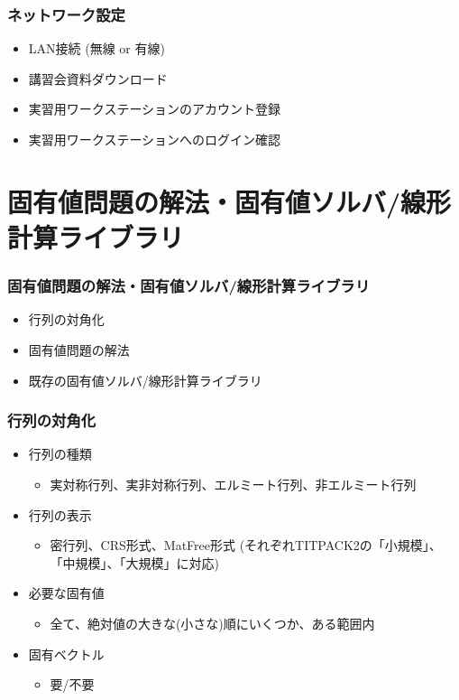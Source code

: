 \begin{frame}
  \frametitle{ネットワーク設定}
  \begin{itemize}
    \setlength{\itemsep}{1em}
  \item LAN接続 (無線 or 有線)
  \item 講習会資料ダウンロード
  \item 実習用ワークステーションのアカウント登録
  \item 実習用ワークステーションへのログイン確認
  \end{itemize}
\end{frame}

\section{固有値問題の解法・固有値ソルバ/線形計算ライブラリ}

\begin{frame}
  \frametitle{固有値問題の解法・固有値ソルバ/線形計算ライブラリ}
  \begin{itemize}
    \setlength{\itemsep}{1em}
  \item 行列の対角化
  \item 固有値問題の解法
  \item 既存の固有値ソルバ/線形計算ライブラリ
  \end{itemize}
\end{frame}

\begin{frame}
  \frametitle{行列の対角化}
  \begin{itemize}
  \item 行列の種類
    \begin{itemize}
    \item 実対称行列、実非対称行列、エルミート行列、非エルミート行列
    \end{itemize}
  \item 行列の表示
    \begin{itemize}
      \item 密行列、CRS形式、MatFree形式 (それぞれTITPACK2の「小規模」、
        「中規模」、「大規模」に対応)
    \end{itemize}
  \item 必要な固有値
    \begin{itemize}
      \item 全て、絶対値の大きな(小さな)順にいくつか、ある範囲内
    \end{itemize}
  \item 固有ベクトル
    \begin{itemize}
      \item 要/不要
    \end{itemize}
  \end{itemize}
\end{frame}


